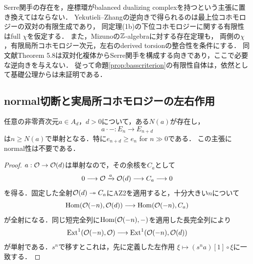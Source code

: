 \documentclass[11pt,a4paper]{ltjsarticle}
\begin{document}
\begin{remark}[双対化複体に関する仮定の区別]
Serre関手の存在を，座標環がbalanced dualizing complexを持つという主張に置き換えてはならない．
Yekutieli--Zhang\cite[Theorem 2.3(2)]{YZ}の逆向きで得られるのは最上位コホモロジーの双対の有限生成であり，
同定理(1b)の下位コホモロジーに関する有限性はfull $\chi$を仮定する．
また，Mizuno\cite[Theorem 4.15]{Mizuno}の$\mathbb Z$-algebraに対する存在定理も，
両側の$\chi$，有限局所コホモロジー次元，左右のderived torsionの整合性を条件にする．
同文献Theorem 5.8は双対化複体からSerre関手を構成する向きであり，ここで必要な逆向きを与えない．
従って命題\ref{prop:basscriterion}の有限性自体は，依然として基礎公理からは未証明である．
\end{remark}

\subsection{normal切断と実局所コホモロジーの左右作用}\label{subsec:normal-vanishing}

\begin{lemma}[任意の非零切断の左作用]\label{lem:left-injective}
任意の非零斉次元$a\in A_d$，$d>0$について，ある$N(a)$が存在し，
\[
 a\cdot-:E_n\longrightarrow E_{n+d}
\]
は$n\geq N(a)$で単射となる．特に$e_{n+d}\geq e_n$ for $n\gg0$である．
この主張にnormal性は不要である．
\end{lemma}
\begin{proof}
$a:\mathcal O\to\mathcal O(d)$は単射なので，その余核を$C_a$として
\[
 0\longrightarrow\mathcal O\xrightarrow{a}\mathcal O(d)\longrightarrow C_a\longrightarrow0
\]
を得る．固定した全射$\mathcal O(d)\twoheadrightarrow C_a$にAZ2を適用すると，十分大きい$n$について
\[
 \operatorname{Hom}(\mathcal O(-n),\mathcal O(d))\longrightarrow\operatorname{Hom}(\mathcal O(-n),C_a)
\]
が全射になる．同じ短完全列に$\operatorname{Hom}(\mathcal O(-n),-)$を適用した長完全列により
\[
 \operatorname{Ext}^1(\mathcal O(-n),\mathcal O)\longrightarrow\operatorname{Ext}^1(\mathcal O(-n),\mathcal O(d))
\]
が単射である．$s^n$で移すとこれは，先に定義した左作用
$\xi\mapsto (s^na)[1]\circ\xi$に一致する．
\end{proof}
\end{document}

